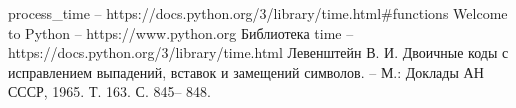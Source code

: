 \documentclass{article}
\begin{document}
\renewcommand{\bibname}{Список использованной литературы}
\clearpage\begin{thebibliography}{4}
	process\_time --  https://docs.python.org/3/library/time.html\#functions
	Welcome to Python -- https://www.python.org
	Библиотека time -- https://docs.python.org/3/library/time.html
	Левенштейн В. И. Двоичные коды с исправлением выпадений, вставок и замещений символов. – М.: Доклады АН 
	СССР, 1965. Т. 163. С. 845– 848.
\end{thebibliography}
\end{document}
